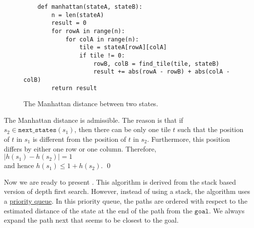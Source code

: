 \begin{enumerate}
      \begin{figure}[!ht]
        \centering
        \begin{verbatim}
    def manhattan(stateA, stateB):
        n = len(stateA)
        result = 0
        for rowA in range(n):
            for colA in range(n): 
                tile = stateA[rowA][colA]
                if tile != 0:
                    rowB, colB = find_tile(tile, stateB)
                    result += abs(rowA - rowB) + abs(colA - colB)
        return result
    \end{verbatim}
    \vspace*{-0.3cm}
    \caption{The Manhattan distance between two states.}
    \label{fig:manhattan.py}
    \end{figure}

    The Manhattan distance is admissible.  The reason is that if $s_2 \in \mathtt{next\_states}(s_1)$,
    then there can be only one tile $t$ such that the position of $t$ in $s_1$ is different from the position
    of $t$ in $s_2$.  Furthermore, this position differs by either one row or one column.  Therefore,
    \\[0.2cm]
    \hspace*{1.3cm}
    $|h(s_1) - h(s_2)| = 1$
    \\[0.2cm]
    and hence $h(s_1) \leq 1 + h(s_2)$.  \qed
\end{enumerate}
Now we are ready to present .  This algorithm is derived from the stack based
version of depth first search.  However, instead of using a stack, the algorithm uses a
\href{https://en.wikipedia.org/wiki/Priority_queue}{priority queue}.  In this priority queue, the paths are
ordered with respect to the estimated distance of the state at the end of the path from the $\texttt{goal}$.
We always expand the path next that seems to be closest to the goal.

